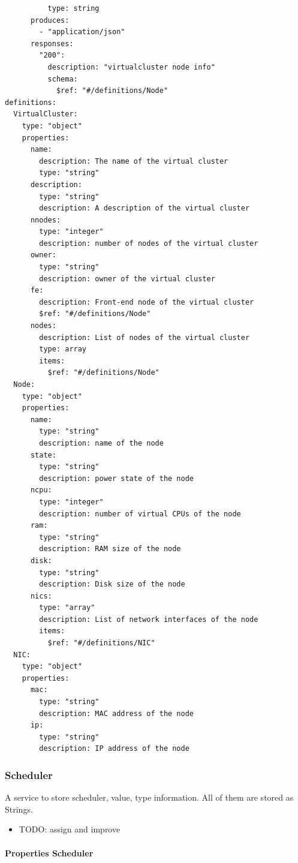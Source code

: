 \documentclass[9pt,]{article}
\providecommand{\tightlist}{%
  \setlength{\itemsep}{0pt}\setlength{\parskip}{0pt}}
\let\oldparagraph\paragraph
\renewcommand{\paragraph}[1]{\oldparagraph{#1}\mbox{}}
\begin{document}
\begin{verbatim}
          type: string
      produces:
        - "application/json"
      responses:
        "200":
          description: "virtualcluster node info"
          schema:
            $ref: "#/definitions/Node"
definitions:
  VirtualCluster:
    type: "object"
    properties:
      name:
        description: The name of the virtual cluster
        type: "string"
      description:
        type: "string"
        description: A description of the virtual cluster
      nnodes:
        type: "integer"
        description: number of nodes of the virtual cluster
      owner:
        type: "string"
        description: owner of the virtual cluster
      fe:
        description: Front-end node of the virtual cluster
        $ref: "#/definitions/Node"
      nodes:
        description: List of nodes of the virtual cluster
        type: array
        items:
          $ref: "#/definitions/Node"
  Node:
    type: "object"
    properties:
      name:
        type: "string"
        description: name of the node
      state:
        type: "string"
        description: power state of the node
      ncpu:
        type: "integer"
        description: number of virtual CPUs of the node
      ram:
        type: "string"
        description: RAM size of the node
      disk:
        type: "string"
        description: Disk size of the node
      nics:
        type: "array"
        description: List of network interfaces of the node
        items:
          $ref: "#/definitions/NIC"
  NIC:
    type: "object"
    properties:
      mac:
        type: "string"
        description: MAC address of the node
      ip:
        type: "string"
        description: IP address of the node
\end{verbatim}

\hypertarget{scheduler}{%
\subsubsection{Scheduler}\label{scheduler}}

A service to store scheduler, value, type information. All of them are
stored as Strings.

\begin{itemize}
\tightlist
\item
  TODO: assign and improve
\end{itemize}

\hypertarget{properties-scheduler}{%
\paragraph{Properties Scheduler}\label{properties-scheduler}}
\end{document}
